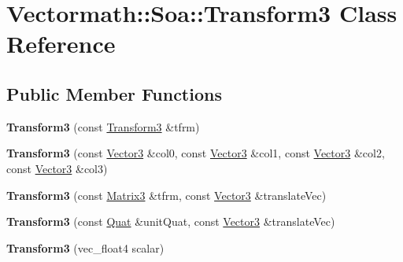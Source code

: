\hypertarget{classVectormath_1_1Soa_1_1Transform3}{\section{Vectormath\-:\-:Soa\-:\-:Transform3 Class Reference}
\label{classVectormath_1_1Soa_1_1Transform3}
}
\subsection*{Public Member Functions}
\begin{DoxyCompactItemize}
\item 
\hypertarget{classVectormath_1_1Soa_1_1Transform3_a997c11a0588c48786b60f458bd049660}{{\bfseries Transform3} (const \hyperlink{classVectormath_1_1Soa_1_1Transform3}{Transform3} \&tfrm)}\label{classVectormath_1_1Soa_1_1Transform3_a997c11a0588c48786b60f458bd049660}

\item 
\hypertarget{classVectormath_1_1Soa_1_1Transform3_a788128c7fcd98464b5c11260759113bd}{{\bfseries Transform3} (const \hyperlink{classVectormath_1_1Soa_1_1Vector3}{Vector3} \&col0, const \hyperlink{classVectormath_1_1Soa_1_1Vector3}{Vector3} \&col1, const \hyperlink{classVectormath_1_1Soa_1_1Vector3}{Vector3} \&col2, const \hyperlink{classVectormath_1_1Soa_1_1Vector3}{Vector3} \&col3)}\label{classVectormath_1_1Soa_1_1Transform3_a788128c7fcd98464b5c11260759113bd}

\item 
\hypertarget{classVectormath_1_1Soa_1_1Transform3_aed3c1c9b8f3e0419676118ad9fe0eb04}{{\bfseries Transform3} (const \hyperlink{classVectormath_1_1Soa_1_1Matrix3}{Matrix3} \&tfrm, const \hyperlink{classVectormath_1_1Soa_1_1Vector3}{Vector3} \&translate\-Vec)}\label{classVectormath_1_1Soa_1_1Transform3_aed3c1c9b8f3e0419676118ad9fe0eb04}

\item 
\hypertarget{classVectormath_1_1Soa_1_1Transform3_a443f4e120c8a396af95a841e83dea628}{{\bfseries Transform3} (const \hyperlink{classVectormath_1_1Soa_1_1Quat}{Quat} \&unit\-Quat, const \hyperlink{classVectormath_1_1Soa_1_1Vector3}{Vector3} \&translate\-Vec)}\label{classVectormath_1_1Soa_1_1Transform3_a443f4e120c8a396af95a841e83dea628}

\item 
\hypertarget{classVectormath_1_1Soa_1_1Transform3_a825327a042ddd95dd7f1cefb9ae30451}{{\bfseries Transform3} (vec\-\_\-float4 scalar)}\label{classVectormath_1_1Soa_1_1Transform3_a825327a042ddd95dd7f1cefb9ae30451}


\end{DoxyCompactItemize}
